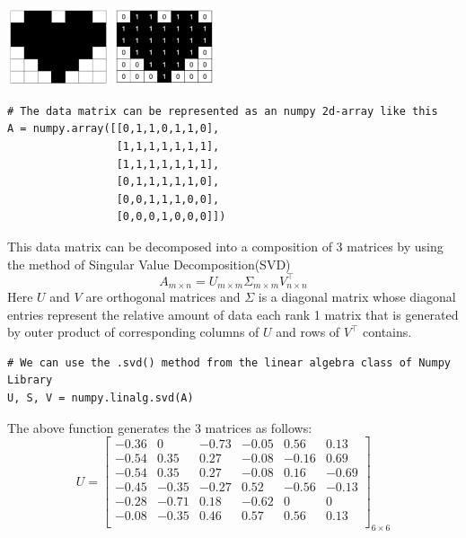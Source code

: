 \documentclass{article}
\begin{document}
\begin{center}
    \includegraphics[width=3cm]{heart.png} \hspace{2cm}
    \includegraphics[width=3cm]{pixel-value-heart.png}
\end{center}

\begin{verbatim}
# The data matrix can be represented as an numpy 2d-array like this
A = numpy.array([[0,1,1,0,1,1,0],
                 [1,1,1,1,1,1,1],
                 [1,1,1,1,1,1,1],
                 [0,1,1,1,1,1,0],
                 [0,0,1,1,1,0,0],
                 [0,0,0,1,0,0,0]])
\end{verbatim}

This data matrix can be decomposed into a composition of 3 matrices by using the method of Singular Value Decomposition(SVD)
$$ A_{m \times n} = U_{m \times m} \Sigma_{m \times m} V^{\top}_{n \times n} $$
Here $U$ and $V$ are orthogonal matrices and $\Sigma$ is a diagonal matrix whose diagonal entries represent the relative amount of data each rank 1 matrix that is generated by outer product of corresponding columns of $U$ and rows of $V^{\top}$ contains. \\

\begin{verbatim}
# We can use the .svd() method from the linear algebra class of Numpy Library
U, S, V = numpy.linalg.svd(A)
\end{verbatim}

The above function generates the 3 matrices as follows:
\begin{equation*}
    U = \begin{bmatrix}
        -0.36 & 0 & -0.73 & -0.05 & 0.56 & 0.13 \\
        -0.54 & 0.35 & 0.27 & -0.08 & -0.16 & 0.69 \\
        -0.54 & 0.35 & 0.27 & -0.08 & 0.16 & -0.69 \\
        -0.45 & -0.35 & -0.27 & 0.52 & -0.56 & -0.13 \\
        -0.28 & -0.71 & 0.18 & -0.62 & 0 & 0 \\
        -0.08 & -0.35 & 0.46 & 0.57 & 0.56 & 0.13 \\
    \end{bmatrix}_{6\times6}
\end{equation*}
\end{document}
